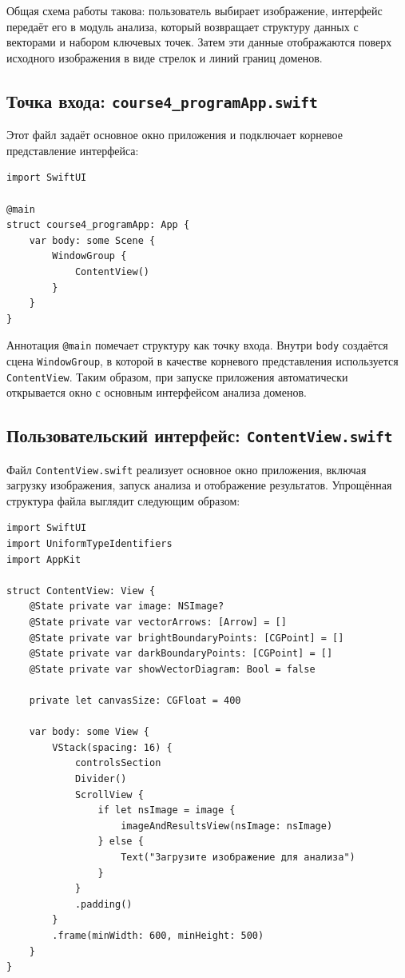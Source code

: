 \documentclass[12pt,a4paper]{article}
\numberwithin{equation}{section}
\begin{document}
Общая схема работы такова: пользователь выбирает изображение, интерфейс передаёт его в модуль анализа, который возвращает структуру данных с векторами и набором ключевых точек. Затем эти данные отображаются поверх исходного изображения в виде стрелок и линий границ доменов.

\subsection{Точка входа: \texttt{course4\_programApp.swift}}

Этот файл задаёт основное окно приложения и подключает корневое представление интерфейса:

\begin{verbatim}
import SwiftUI

@main
struct course4_programApp: App {
    var body: some Scene {
        WindowGroup {
            ContentView()
        }
    }
}
\end{verbatim}

Аннотация \texttt{@main} помечает структуру как точку входа. Внутри \texttt{body} создаётся сцена \texttt{WindowGroup}, в которой в качестве корневого представления используется \texttt{ContentView}. Таким образом, при запуске приложения автоматически открывается окно с основным интерфейсом анализа доменов.

\subsection{Пользовательский интерфейс: \texttt{ContentView.swift}}

Файл \texttt{ContentView.swift} реализует основное окно приложения, включая загрузку изображения, запуск анализа и отображение результатов. Упрощённая структура файла выглядит следующим образом:

\begin{verbatim}
import SwiftUI
import UniformTypeIdentifiers
import AppKit

struct ContentView: View {
    @State private var image: NSImage?
    @State private var vectorArrows: [Arrow] = []
    @State private var brightBoundaryPoints: [CGPoint] = []
    @State private var darkBoundaryPoints: [CGPoint] = []
    @State private var showVectorDiagram: Bool = false

    private let canvasSize: CGFloat = 400

    var body: some View {
        VStack(spacing: 16) {
            controlsSection
            Divider()
            ScrollView {
                if let nsImage = image {
                    imageAndResultsView(nsImage: nsImage)
                } else {
                    Text("Загрузите изображение для анализа")
                }
            }
            .padding()
        }
        .frame(minWidth: 600, minHeight: 500)
    }
}
\end{verbatim}
\end{document}
